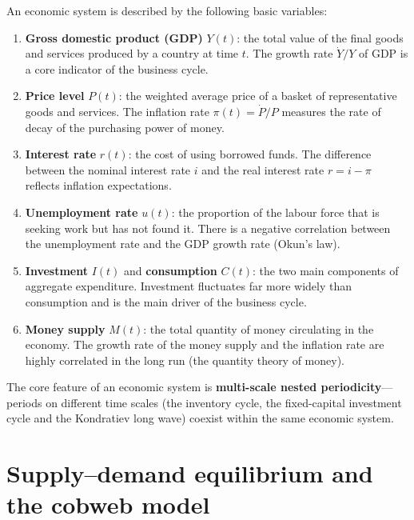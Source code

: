 \begin{definition}\label{def:economic_quantities}
An economic system is described by the following basic variables:
\begin{enumerate}[label=(\roman*)]
    \item \textbf{Gross domestic product (GDP)} $Y(t)$: the total value of the final goods and services produced by a country at time $t$. The growth rate $\dot{Y}/Y$ of GDP is a core indicator of the business cycle.
    \item \textbf{Price level} $P(t)$: the weighted average price of a basket of representative goods and services. The inflation rate $\pi(t) = \dot{P}/P$ measures the rate of decay of the purchasing power of money.
    \item \textbf{Interest rate} $r(t)$: the cost of using borrowed funds. The difference between the nominal interest rate $i$ and the real interest rate $r = i - \pi$ reflects inflation expectations.
    \item \textbf{Unemployment rate} $u(t)$: the proportion of the labour force that is seeking work but has not found it. There is a negative correlation between the unemployment rate and the GDP growth rate (Okun's law).
    \item \textbf{Investment} $I(t)$ and \textbf{consumption} $C(t)$: the two main components of aggregate expenditure. Investment fluctuates far more widely than consumption and is the main driver of the business cycle.
    \item \textbf{Money supply} $M(t)$: the total quantity of money circulating in the economy. The growth rate of the money supply and the inflation rate are highly correlated in the long run (the quantity theory of money).
\end{enumerate}
The core feature of an economic system is \textbf{multi-scale nested periodicity}---periods on different time scales (the inventory cycle, the fixed-capital investment cycle and the Kondratiev long wave) coexist within the same economic system.
\end{definition}

\section{Supply--demand equilibrium and the cobweb model}

